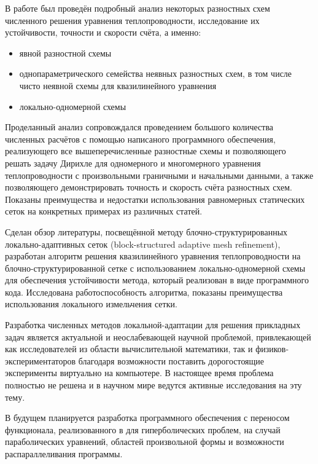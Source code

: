 В работе был проведён подробный анализ некоторых разностных схем численного решения уравнения теплопроводности, исследование их устойчивости, точности и скорости счёта, а именно:
\begin{itemize}
    \item явной разностной схемы
    \item однопараметрического семейства неявных разностных схем, в том числе чисто неявной схемы для квазилинейного уравнения
    \item локально-одномерной схемы
\end{itemize}
Проделанный анализ сопровождался проведением большого количества численных расчётов с помощью написаного программного обеспечения, реализующего все вышеперечисленные разностные схемы и позволяющего решать задачу Дирихле для одномерного и многомерного уравнения теплопроводности с произвольными граничными и начальными данными, а также позволяющего демонстрировать точность и скорость счёта разностных схем.
Показаны преимущества и недостатки использования равномерных статических сеток на конкретных примерах из различных статей.

Сделан обзор литературы, посвещённой методу блочно-структурированных локально-адаптивных сеток (block-structured adaptive mesh refinement), разработан алгоритм решения квазилинейного уравнения теплопроводности на блочно-структурированной сетке с использованием локально-одномерной схемы для обеспечения устойчивости метода, который реализован в виде программного кода.
Исследована работоспособность алгоритма, показаны преимущества использования локального измельчения сетки.

Разработка численных методов локальной-адаптации для решения прикладных задач является актуальной и неослабевающей научной проблемой, привлекающей как исследователей из области вычислительной математики, так и физиков-экспериментаторов благодаря возможности поставить дорогостоящие эксперименты виртуально на компьютере.
В настоящее время проблема полностью не решена и в научном мире ведутся активные исследования на эту тему.

В будущем планируется разработка программного обеспечения с переносом функционала, реализованного в \cite{ranocha2022adaptive, schlottkelakemper2021purely, schlottkelakemper2020trixi} для гиперболических проблем, на случай параболических уравнений, областей произвольной формы и возможности распараллеливания программы.